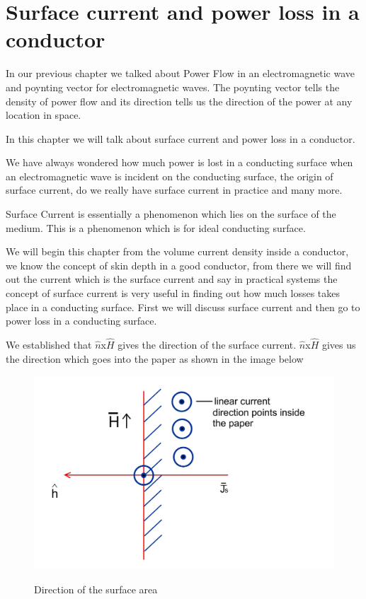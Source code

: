 \chapter{Surface current and power loss in a conductor}
In our previous chapter we talked about Power Flow in an electromagnetic wave and poynting vector for electromagnetic waves. The poynting vector tells the density of power flow and its direction tells us the direction of the power at any location in space.

In this chapter we will talk about surface current and power loss in a conductor.

We have always wondered how much power is lost in a conducting surface when an electromagnetic wave is incident on the conducting surface, the origin of surface current, do we really have surface current in practice and many more.

Surface Current is essentially a phenomenon which lies on the surface of the medium. This is a phenomenon which is for ideal conducting surface.

We will begin this chapter from the volume current density inside a conductor, we know the concept of skin depth in a good conductor, from there we will find out the current which is the surface current and say in practical systems the concept of surface current is very useful in finding out how much losses takes place in a conducting surface. First we will discuss surface current and then go to power loss in a conducting surface.

We established that $\hat{n}$x$\hat{H}$ gives the direction of the surface current. $\hat{n}$x$\hat{H}$ gives us the direction which goes into the paper as shown in the image below
\begin{figure}[h]
\centering
\textsc{\includegraphics[width=.7\linewidth]{./graphics/Bello281}}
\caption{Direction of the surface area }
\end{figure}

